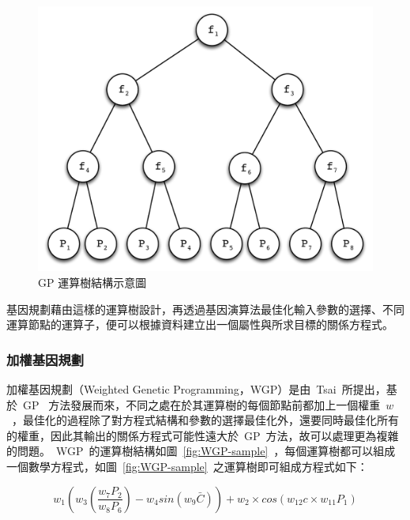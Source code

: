\begin{figure}[hbtp]
  \begin{center}
    \includegraphics[width=1.0\textwidth]{figures/gp-struct.pdf}
    \caption{GP 運算樹結構示意圖} 
    \label{fig:GP-struct}
  \end{center}
\end{figure}

基因規劃藉由這樣的運算樹設計，再透過基因演算法最佳化輸入參數的選擇、不同運算節點的運算子，便可以根據資料建立出一個屬性與所求目標的關係方程式。

\subsubsection{加權基因規劃}

加權基因規劃（Weighted Genetic Programming，WGP）是由~Tsai\cite{tsai2011predicting}~所提出，基於~GP~ 方法發展而來，不同之處在於其運算樹的每個節點前都加上一個權重~$w$~，最佳化的過程除了對方程式結構和參數的選擇最佳化外，還要同時最佳化所有的權重，因此其輸出的關係方程式可能性遠大於~GP~方法，故可以處理更為複雜的問題。~WGP~的運算樹結構如圖~\ref{fig:WGP-sample}~，每個運算樹都可以組成一個數學方程式，如圖~\ref{fig:WGP-sample}~之運算樹即可組成方程式如下：

\begin{equation} w_1(w_3(\dfrac{w_7P_2}{w_8P_6}) - w_4sin(w_9\bar{C}))+w_2 \times cos(w_{12}c \times w_{11}P_1) \label{eq:WGP-sample}\end{equation} 



